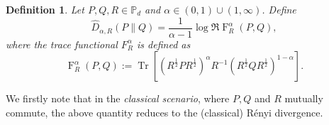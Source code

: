 \documentclass[12pt]{article}
\newtheorem{definition}[theorem]{Definition}
\theoremstyle{definition}
\newcommand{\Fga}[3]{\operatorname{F}_{#3}^\alpha\left(#1, #2\right)}
\begin{document}
\begin{definitionbox}
\begin{definition}
Let $P,Q,R \in \mathbb P_d$ and $\alpha \in (0,1) \cup (1, \infty)$. Define
\begin{equation}
    \hat{D}_{\alpha, R} (P \| Q) = \frac1{\alpha-1} \log \Re \operatorname{F}_{R}^\alpha(P,Q),    
\end{equation}
where the trace functional $F_R^\alpha$ is defined as
\begin{equation}
    \Fga{P}{Q}{R} := \operatorname{Tr}\left[\left( R ^{\frac12} P R ^{\frac12} \right)^\alpha R ^{-1} \left( R ^{\frac12} Q R ^{\frac12} \right)^{1-\alpha}  \right]. 
\end{equation}
\end{definition}
\end{definitionbox}

We firstly note that in the \textit{classical scenario}, where $P,Q$ and $R$ mutually commute, the above quantity reduces to the (classical) R\'enyi divergence. 
\end{document}
